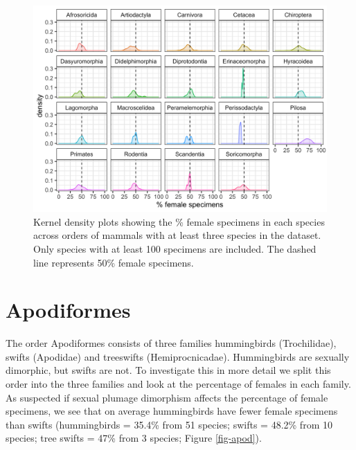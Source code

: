 \documentclass[a4paper, 12pt]{article}
\begin{document}
\begin{figure}[H]
 \centering
  \includegraphics[width = \linewidth]{figures/orders-density-mammals-all.png}
  \caption{Kernel density plots showing the \% female specimens in each species across orders of mammals with at least three species in the dataset. 
  Only species with at least 100 specimens are included. 
  The dashed line represents 50\% female specimens.}
  \label{fig-mammal-orders}
\end{figure}

\newpage


\newpage
\section{Apodiformes}

The order Apodiformes consists of three families hummingbirds (Trochilidae), swifts (Apodidae) and treeswifts (Hemiprocnicadae).
Hummingbirds are sexually dimorphic, but swifts are not. 
To investigate this in more detail we split this order into the three families and look at the percentage of females in each family. 
As suspected if sexual plumage dimorphism affects the percentage of female specimens, we see that on average hummingbirds have fewer female specimens than swifts (hummingbirds = 35.4\% from 51 species; swifts = 48.2\% from 10 species; tree swifts = 47\% from 3 species; Figure \ref{fig-apod}).
\end{document}
